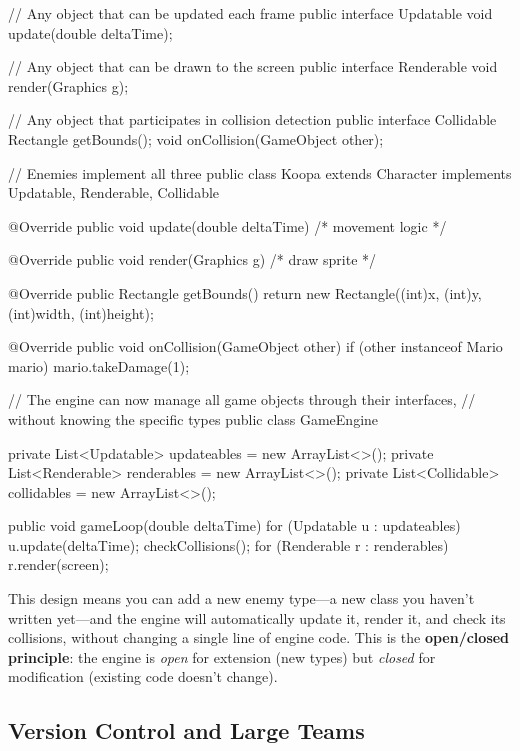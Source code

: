 \documentclass[11pt,letterpaper]{article}
\newcommand{\keyterm}[1]{\textbf{\textcolor{cssecondary}{#1}}}
\begin{document}
\begin{javacode}
// Any object that can be updated each frame
public interface Updatable {
    void update(double deltaTime);
}

// Any object that can be drawn to the screen
public interface Renderable {
    void render(Graphics g);
}

// Any object that participates in collision detection
public interface Collidable {
    Rectangle getBounds();
    void onCollision(GameObject other);
}

// Enemies implement all three
public class Koopa extends Character
        implements Updatable, Renderable, Collidable {

    @Override
    public void update(double deltaTime) { /* movement logic */ }

    @Override
    public void render(Graphics g)       { /* draw sprite */    }

    @Override
    public Rectangle getBounds()         { return new Rectangle((int)x, (int)y,
                                                   (int)width, (int)height); }

    @Override
    public void onCollision(GameObject other) {
        if (other instanceof Mario mario) {
            mario.takeDamage(1);
        }
    }
}

// The engine can now manage all game objects through their interfaces,
// without knowing the specific types
public class GameEngine {
    private List<Updatable>  updateables = new ArrayList<>();
    private List<Renderable> renderables = new ArrayList<>();
    private List<Collidable> collidables = new ArrayList<>();

    public void gameLoop(double deltaTime) {
        for (Updatable u  : updateables)  u.update(deltaTime);
        checkCollisions();
        for (Renderable r : renderables)  r.render(screen);
    }
}
\end{javacode}

This design means you can add a new enemy type---a new class you haven't written yet---and the engine will automatically update it, render it, and check its collisions, without changing a single line of engine code. This is the \keyterm{open/closed principle}: the engine is \textit{open} for extension (new types) but \textit{closed} for modification (existing code doesn't change).

\subsection{Version Control and Large Teams}
\end{document}
